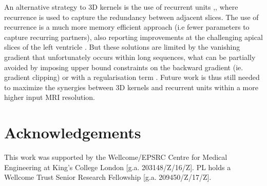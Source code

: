 \documentclass{llncs}
\begin{document}
An alternative strategy to 3D kernels is the use of recurrent units \cite{Poudel},\cite{Jianxu},  where recurrence is used to capture the redundancy between adjacent slices. The use of recurrence is a much more memory efficient approach (i.e fewer parameters to capture recurring partners), also reporting improvements at the challenging apical slices of the left ventricle \cite{Poudel}. But these solutions are limited by the vanishing gradient that unfortunately occurs within long sequences, what can be partially avoided by imposing upper bound constraints on the backward gradient (ie. gradient clipping) or with a regularisation term \cite{Razvan}. Future work is thus still needed to maximize the synergies between 3D kernels and recurrent units within a more higher input MRI resolution.

\section*{Acknowledgements}

This work was supported by the Wellcome/EPSRC Centre for Medical Engineering at King’s College London [g.a. 203148/Z/16/Z]. PL holds a Wellcome Trust Senior Research Fellowship [g.a. 209450/Z/17/Z].
%
\end{document}

